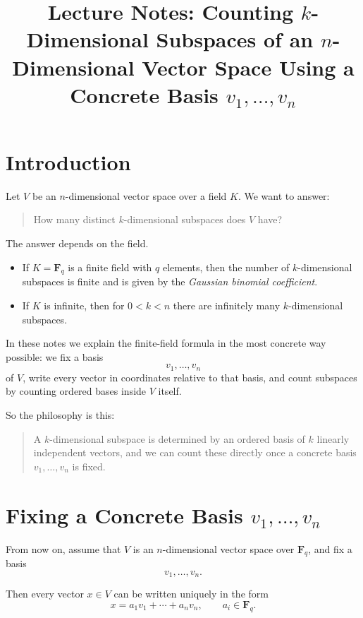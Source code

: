 \documentclass[11pt]{article}
\title{Lecture Notes: Counting \(k\)-Dimensional Subspaces of an \(n\)-Dimensional Vector Space Using a Concrete Basis \(v_1,\dots,v_n\)}
\author{}
\date{}
\theoremstyle{definition}
\theoremstyle{remark}
\newcommand{\F}{\mathbf{F}}
\begin{document}
	
	\maketitle
	
	\tableofcontents
	
	\section{Introduction}
	
	Let \(V\) be an \(n\)-dimensional vector space over a field \(K\). We want to answer:
	
	\begin{quote}
		How many distinct \(k\)-dimensional subspaces does \(V\) have?
	\end{quote}
	
	The answer depends on the field.
	
	\begin{itemize}
		\item If \(K=\F_q\) is a finite field with \(q\) elements, then the number of \(k\)-dimensional subspaces is finite and is given by the \emph{Gaussian binomial coefficient}.
		\item If \(K\) is infinite, then for \(0<k<n\) there are infinitely many \(k\)-dimensional subspaces.
	\end{itemize}
	
	In these notes we explain the finite-field formula in the most concrete way possible: we fix a basis
	\[
	v_1,\dots,v_n
	\]
	of \(V\), write every vector in coordinates relative to that basis, and count subspaces by counting ordered bases inside \(V\) itself.
	
	So the philosophy is this:
	
	\begin{quote}
		A \(k\)-dimensional subspace is determined by an ordered basis of \(k\) linearly independent vectors, and we can count these directly once a concrete basis \(v_1,\dots,v_n\) is fixed.
	\end{quote}
	
	\section{Fixing a Concrete Basis \(v_1,\dots,v_n\)}
	
	From now on, assume that \(V\) is an \(n\)-dimensional vector space over \(\F_q\), and fix a basis
	\[
	v_1,\dots,v_n.
	\]
	
	Then every vector \(x\in V\) can be written uniquely in the form
	\[
	x=a_1v_1+\cdots+a_nv_n,
	\qquad a_i\in \F_q.
	\]
	
\end{document}
